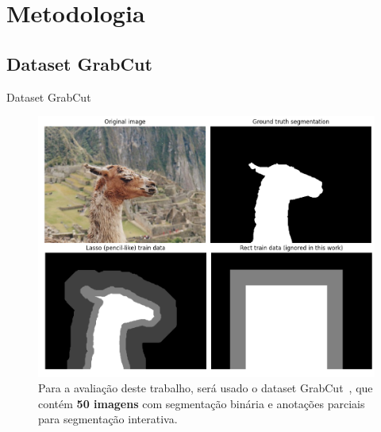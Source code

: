 \documentclass{templatebeamerufc/libs/ufc_format}
\begin{document}
\section{Metodologia}

\subsection{Dataset GrabCut}
\begin{frame}{Dataset GrabCut}

    \begin{figure}\label{fig:grabcut-dataset}
    \centering
    \caption{ Para a avaliação deste trabalho,
será usado o dataset GrabCut~\cite{rother2004grabcut}, que contém
\textbf{50 imagens} com segmentação binária e anotações parciais para
segmentação interativa.}
    \includegraphics[scale=0.21]{figuras/grabcut-dataset}
    \source{\fonteautor}
  \end{figure}

\end{frame}
\end{document}
